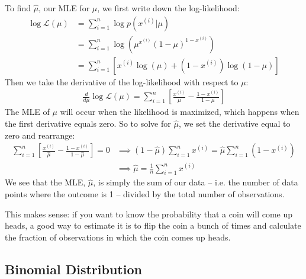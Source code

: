 To find $\hat{\mu}$, our MLE for $\mu$, we first write down the log-likelihood:
\begin{align*}
\log \mathcal{L}(\mu) &= \sum_{i=1}^n \log p(x^{(i)}|\mu) \\
&= \sum_{i=1}^n \log \left( \mu^{x^{(i)}}(1-\mu)^{1-x^{(i)}} \right) \\
&= \sum_{i=1}^n \left[ x^{(i)} \log(\mu) + (1-x^{(i)}) \log(1-\mu) \right] \end{align*}
Then we take the derivative of the log-likelihood with respect to $\mu$:
\begin{align*}
\frac{d}{d \mu} \log \mathcal{L}(\mu) = \sum_{i=1}^n \left[ \frac{x^{(i)}}{\mu} - \frac{1-x^{(i)}}{1-\mu} \right]
\end{align*}
The MLE of $\mu$ will occur when the likelihood is maximized, which happens when the first derivative equals zero. So to solve for $\hat{\mu}$, we set the derivative equal to zero and rearrange:
\begin{align*} \sum_{i=1}^n \left[ \frac{x^{(i)}}{\hat{\mu}} - \frac{1-x^{(i)}}{1-\hat{\mu}} \right] = 0 & \implies (1 - \hat{\mu}) \sum_{i=1}^n x^{(i)} = \hat{\mu} \sum_{i=1}^n (1 - x^{(i)}) \\
& \implies \boxed{\hat{\mu} = \frac{1}{n} \sum_{i=1}^n x^{(i)}} \end{align*}
We see that the MLE, $\hat{\mu}$, is simply the sum of our data -- i.e. the number of data points where the outcome is 1 -- divided by the total number of observations. 

This makes sense: if you want to know the probability that a coin will come up heads, a good way to estimate it is to flip the coin a bunch of times and calculate the fraction of observations in which the coin comes up heads. 

\subsection{Binomial Distribution}

